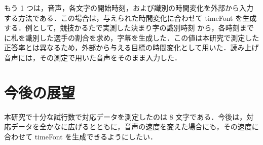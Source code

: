 もう 1 つは，音声，各文字の開始時刻，および識別の時間変化を外部から入力する方法である．この場合は，与えられた時間変化に合わせて timeFont を生成する．例として，競技かるたで実測した決まり字の識別時刻 \cite{maruyama} から，各時刻までに札を識別した選手の割合を求め，字幕を生成した．この値は本研究で測定した正答率とは異なるため，外部から与える目標の時間変化として用いた．読み上げ音声には，その測定で用いた音声をそのまま入力した．


\section{今後の展望}


本研究で十分な試行数で対応データを測定したのは 8 文字である．今後は，対応データを全かなに広げるとともに，音声の速度を変えた場合にも，その速度に合わせて timeFont を生成できるようにしたい．


